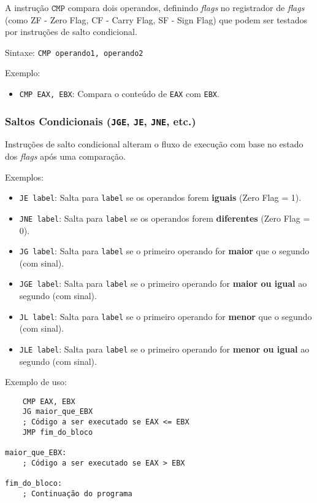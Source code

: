 \documentclass{article}
\begin{document}
A instrução $\texttt{CMP}$ compara dois operandos, definindo \textit{flags} no registrador de \textit{flags} (como ZF - Zero Flag, CF - Carry Flag, SF - Sign Flag) que podem ser testados por instruções de salto condicional.

Sintaxe: \texttt{CMP operando1, operando2}

Exemplo:

\begin{itemize}
    \item \texttt{CMP EAX, EBX}: Compara o conteúdo de \texttt{EAX} com \texttt{EBX}.
\end{itemize}

\subsubsection{Saltos Condicionais (\texttt{JGE}, \texttt{JE}, \texttt{JNE}, etc.)}

Instruções de salto condicional alteram o fluxo de execução com base no estado dos \textit{flags} após uma comparação.

Exemplos:

\begin{itemize}
    \item \texttt{JE label}: Salta para \texttt{label} se os operandos forem \textbf{iguais} (Zero Flag = 1).
    \item \texttt{JNE label}: Salta para \texttt{label} se os operandos forem \textbf{diferentes} (Zero Flag = 0).
    \item \texttt{JG label}: Salta para \texttt{label} se o primeiro operando for \textbf{maior} que o segundo (com sinal).
    \item \texttt{JGE label}: Salta para \texttt{label} se o primeiro operando for \textbf{maior ou igual} ao segundo (com sinal).
    \item \texttt{JL label}: Salta para \texttt{label} se o primeiro operando for \textbf{menor} que o segundo (com sinal).
    \item \texttt{JLE label}: Salta para \texttt{label} se o primeiro operando for \textbf{menor ou igual} ao segundo (com sinal).
\end{itemize}

Exemplo de uso:

\begin{verbatim}
    CMP EAX, EBX
    JG maior_que_EBX
    ; Código a ser executado se EAX <= EBX
    JMP fim_do_bloco

maior_que_EBX:
    ; Código a ser executado se EAX > EBX

fim_do_bloco:
    ; Continuação do programa
\end{verbatim}
\end{document}
